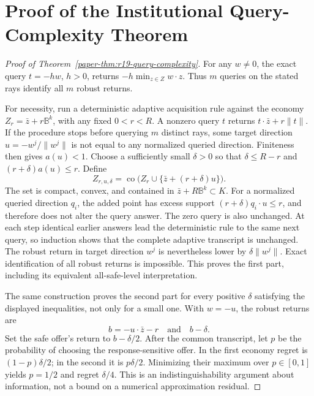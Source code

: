 \section{Proof of the Institutional Query-Complexity Theorem}
\label{sec:r19-complexity-proof}
\begin{proof}[Proof of Theorem~\ref{paper-thm:r19-query-complexity}]
For any $w\ne0$, the exact query $t=-hw$, $h>0$, returns $-h\min_{z\in Z}w\cdot z$. Thus $m$ queries on the stated rays identify all $m$ robust returns.

For necessity, run a deterministic adaptive acquisition rule against the economy $Z_r=\bar z+r\mathbb B^k$, with any fixed $0<r<R$. A nonzero query $t$ returns $t\cdot\bar z+r\|t\|$. If the procedure stops before querying $m$ distinct rays, some target direction $u=-w^j/\|w^j\|$ is not equal to any normalized queried direction. Finiteness then gives $a(u)<1$. Choose a sufficiently small $\delta>0$ so that $\delta\leq R-r$ and $(r+\delta)a(u)\leq r$. Define
\begin{equation}
 Z_{r,u,\delta}=\operatorname{co}\bigl(Z_r\cup\{\bar z+(r+\delta)u\}\bigr).
 \label{eq:r19-spike-set}
\end{equation}
The set is compact, convex, and contained in $\bar z+R\mathbb B^k\subset K$. For a normalized queried direction $q_i$, the added point has excess support $(r+\delta)q_i\cdot u\leq r$, and therefore does not alter the query answer. The zero query is also unchanged. At each step identical earlier answers lead the deterministic rule to the same next query, so induction shows that the complete adaptive transcript is unchanged. The robust return in target direction $w^j$ is nevertheless lower by $\delta\|w^j\|$. Exact identification of all robust returns is impossible. This proves the first part, including its equivalent all-safe-level interpretation.

The same construction proves the second part for every positive $\delta$ satisfying the displayed inequalities, not only for a small one. With $w=-u$, the robust returns are
\[
 b=-u\cdot\bar z-r\quad\text{and}\quad b-\delta.
\]
Set the safe offer's return to $b-\delta/2$. After the common transcript, let $p$ be the probability of choosing the response-sensitive offer. In the first economy regret is $(1-p)\delta/2$; in the second it is $p\delta/2$. Minimizing their maximum over $p\in[0,1]$ yields $p=1/2$ and regret $\delta/4$. This is an indistinguishability argument about information, not a bound on a numerical approximation residual.


\end{proof}
